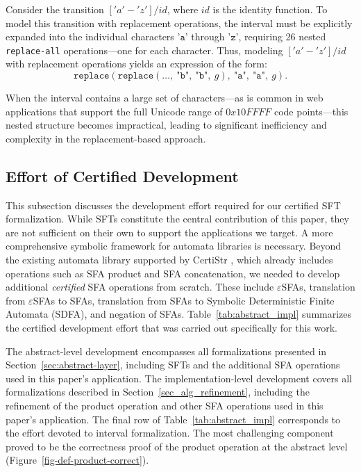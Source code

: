 Consider the transition $['a'-'z']/id$, where $id$ is the identity function. To model this transition with replacement operations, the interval must be explicitly expanded into the individual characters $\texttt{'a'}$ through $\texttt{'z'}$, requiring 26 nested \texttt{replace-all} operations—one for each character. Thus, modeling $['a'-'z']/id$ with replacement operations yields an expression of the form:
\[
\texttt{replace}(\texttt{replace}(\ldots,~\texttt{"b"},~\texttt{"b"},~g),~\texttt{"a"},~\texttt{"a"},~g).
\]

When the interval contains a large set of characters—as is common in web applications that support the full Unicode range of $0x10FFFF$ code points—this nested structure becomes impractical, leading to significant inefficiency and complexity in the replacement-based approach.






\subsection{Effort of Certified Development}

This subsection discusses the development effort required for our certified SFT formalization. While SFTs constitute the central contribution of this paper, they are not sufficient on their own to support the applications we target. A more comprehensive symbolic framework for automata libraries is necessary. Beyond the existing automata library supported by CertiStr \cite{cpp/KanLRS22}, which already includes operations such as SFA product and SFA concatenation, we needed to develop additional \emph{certified} SFA operations from scratch. These include $\varepsilon$SFAs, translation from $\varepsilon$SFAs to SFAs, translation from SFAs to Symbolic Deterministic Finite Automata (SDFA), and negation of SFAs. Table~\ref{tab:abstract_impl} summarizes the certified development effort that was carried out specifically for this work.

The abstract-level development encompasses all formalizations presented in Section~\ref{sec:abstract-layer}, including SFTs and the additional SFA operations used in this paper's application. The implementation-level development covers all formalizations described in Section~\ref{sec_alg_refinement}, including the refinement of the product operation and other SFA operations used in this paper's application. The final row of Table~\ref{tab:abstract_impl} corresponds to the effort devoted to interval formalization. The most challenging component proved to be the correctness proof of the product operation at the abstract level (Figure~\ref{fig-def-product-correct}).

